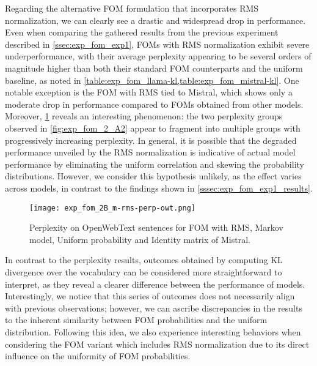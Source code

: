 
Regarding the alternative FOM formulation that incorporates RMS normalization, we can clearly see a drastic and widespread drop in performance.
Even when comparing the gathered results from the previous experiment described in \cref{ssec:exp_fom_exp1}, FOMs with RMS normalization exhibit severe underperformance, with their average perplexity appearing to be several orders of magnitude higher than both their standard FOM counterparts and the uniform baseline, as noted in \cref{table:exp_fom_llama-kl,table:exp_fom_mistral-kl}.
One notable exception is the FOM with RMS tied to Mistral, which shows only a moderate drop in performance compared to FOMs obtained from other models.
Moreover, \cref{fig:exp_fom_2_B} reveals an interesting phenomenon: the two perplexity groups observed in \cref{fig:exp_fom_2_A2} appear to fragment into multiple groups with progressively increasing perplexity.
In general, it is possible that the degraded performance unveiled by the RMS normalization is indicative of actual model performance by eliminating the uniform correlation and skewing the probability distributions.
However, we consider this hypothesis unlikely, as the effect varies across models, in contrast to the findings shown in \cref{sssec:exp_fom_exp1_results}.

\begin{figure}[t!]
    \centering
    \texttt{[image: exp\_fom\_2B\_m-rms-perp-owt.png]}
    \caption{Perplexity on OpenWebText sentences for FOM with RMS, Markov model, Uniform probability and Identity matrix of Mistral.}
    \label{fig:exp_fom_2_B}
\end{figure}

In contrast to the perplexity results, outcomes obtained by computing KL divergence over the vocabulary can be considered more straightforward to interpret, as they reveal a clearer difference between the performance of models.
Interestingly, we notice that this series of outcomes does not necessarily align with previous observations; however, we can ascribe discrepancies in the results to the inherent similarity between FOM probabilities and the uniform distribution.
Following this idea, we also experience interesting behaviors when considering the FOM variant which includes RMS normalization due to its direct influence on the uniformity of FOM probabilities.


